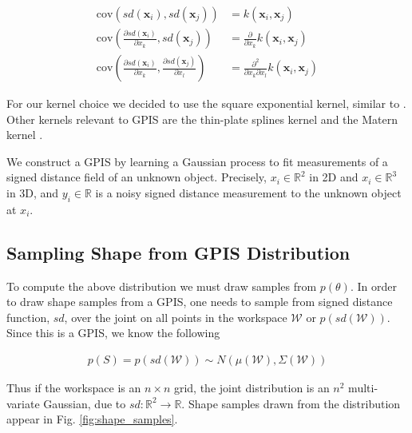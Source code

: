 \documentclass[journal,transmag]{IEEEtran}%
\newcommand{\bx}{\mathbf{x}}
\begin{document}
\vspace{-2ex}
\begin{align}
	\text{cov}\left(sd(\bx_i), sd(\bx_j) \right) &=  k(\bx_i, \bx_j) \\
	\text{cov}\left(\frac{\partial sd (\bx_i)}{\partial x_k}, sd(\bx_j) \right) &= \frac{\partial}{\partial x_k} k(\bx_i, \bx_j) \label{eq:mean_gradient}\\
	\text{cov}\left(\frac{\partial sd (\bx_i)}{\partial x_k}, \frac{\partial sd (\bx_j)}{\partial x_l} \right) &= \frac{\partial^2}{\partial x_k \partial x_l} k(\bx_i, \bx_j)\label{eq:cov_gradient}
\end{align}


For our kernel choice we decided to use the square exponential kernel, similar to \cite{dragiev2011}. Other kernels relevant to GPIS are the thin-plate splines kernel and the Matern kernel \cite{williams2007}. 


We construct a GPIS by learning a Gaussian process to fit measurements of a signed distance field of an unknown object.  Precisely, $x_i \in \mathbb{R}^2$ in 2D and $x_i \in \mathbb{R}^3$ in 3D, and $y_i \in \mathbb{R}$ is a noisy signed distance measurement to the unknown object at $x_i$.



\subsection{Sampling Shape from GPIS Distribution }
To compute the above distribution we must draw samples from $p(\theta)$. In order to draw shape samples from a GPIS, one needs to sample from signed distance function, $sd$, over the joint on all points in the workspace $\mathcal{W}$ or $p(sd(\mathcal{W}))$. Since this is a GPIS, we know the following 

\vspace{-2ex}
\begin{align}\label{eq:joint_shape}
p(S) = p(sd(\mathcal{W})) \sim N(\mu(\mathcal{W}),\Sigma(\mathcal{W}))
\end{align}

Thus if the workspace is an $n \times n$ grid, the joint distribution is an  $n^2$ multi-variate Gaussian, due to $sd:\mathbb{R}^2 \rightarrow \mathbb{R}$.  Shape samples drawn from the distribution appear in Fig. \ref{fig:shape_samples}.
\end{document}

